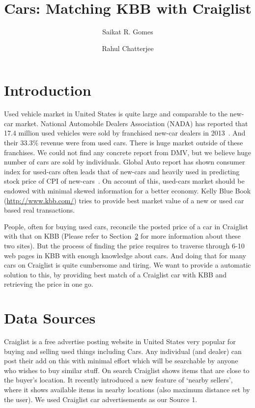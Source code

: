 \documentclass[dvips,11pt]{article}
\title{Cars: Matching KBB with Craiglist}
\author{Saikat R. Gomes \and Rahul Chatterjee}
\date{}
\begin{document}
\maketitle

\section{Introduction}
Used vehicle market in United States is quite large and comparable to the new-car market. National
Automobile Dealers Association (NADA) has reported that 17.4 million used vehicles were sold by
franchised new-car dealers in 2013~\cite{nada2014}. And their 33.3\% revenue were from used
cars. There is huge market outside of these franchises. We could not find any concrete report from
DMV, but we believe huge number of cars are sold by individuals. Global Auto report has shown
consumer index for used-cars often leads that of new-cars and heavily used in predicting stock price
of CPI of new-cars~\cite{gar}. On account of this, used-cars market should be endowed with minimal
skewed information for a better economy. Kelly Blue Book (\url{http://www.kbb.com/}) tries to
provide best market value of a new or used car based real transactions.

People, often for buying used cars, reconcile the posted price of a car in Craiglist with that on
KBB (Please refer to Section~\ref{data-sources} for more information about these two sites). But the
process of finding the price requires to traverse through 6-10 web pages in KBB with enough
knowledge about cars. And doing that for many cars on Craiglist is quite cumbersome and tiring. We
want to provide a automatic solution to this, by providing best match of a Craiglist car with KBB
and retrieving the price in one go.
 

\section{Data Sources}
\label{data-sources}
\par Craiglist is a free advertise posting website in United States very popular for buying and
selling used things including Cars. Any individual (and dealer) can post their add on this with
minimal effort which will be searchable by anyone who wishes to buy similar stuff. On search
Craiglist shows items that are close to the buyer's location. It recently introduced a new feature
of `nearby sellers', where it shows available items in nearby locations (also maximum distance set
by the user). We used Craiglist car advertisements as our Source 1.
\end{document}
